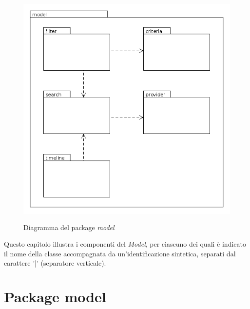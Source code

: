 \documentclass[10pt,a4paper,headinclude,footinclude,hidelinks]{scrreprt} %
\begin{document}
	\begin{figure}[ht]
		\begin{center}
	    	\includegraphics[width=12cm]{package/model.png}
			\label{gfx:package:model}
			\caption{Diagramma del package \textit{model}}
		\end{center}
	\end{figure}

	Questo capitolo illustra i componenti del \textit{Model}, per ciascuno dei quali è indicato il nome della classe accompagnata da un'identificazione sintetica, separati dal carattere '|' (separatore verticale).

	\section{Package model}
	\label{sec:stage:design:model}
\end{document}
